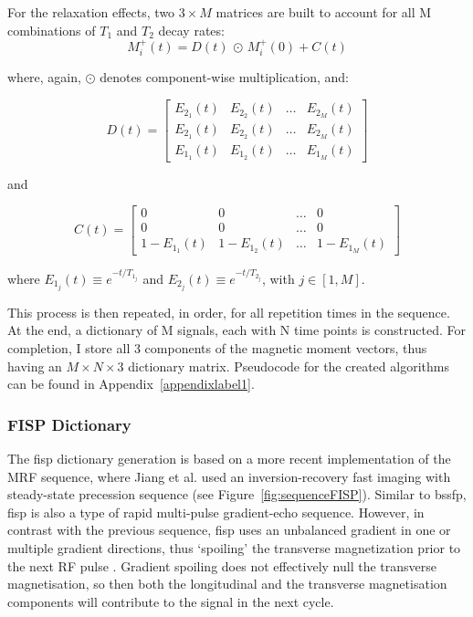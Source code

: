 For the relaxation effects, two $3 \times M$ matrices are built to account for all M combinations of $T_1$ and $T_2$ decay rates:
\begin{equation}
    M^{+}_i(t) = D(t)  \, \odot \, M^{+}_i(0) + C(t) 
\end{equation}

where, again, $\odot$ denotes component-wise multiplication, and:

\begin{equation}
    D(t)  = 
    \begin{bmatrix}
        E_{2_1}(t)  & E_{2_2}(t)  & \dots & E_{2_M}(t)  \\
        E_{2_1}(t)  & E_{2_2}(t)  & \dots & E_{2_M}(t)  \\
        E_{1_1}(t)  & E_{1_2}(t)  & \dots & E_{1_M}(t)  
    \end{bmatrix}
\end{equation}

and

\begin{equation}
    C(t)  = 
    \begin{bmatrix}
        0 & 0 & \dots & 0 \\
        0 & 0 & \dots & 0 \\
        1 - E_{1_1}(t)  & 1- E_{1_2}(t)  & \dots & 1- E_{1_M}(t)  
    \end{bmatrix} 
\end{equation}

where $E_{1_j}(t) \equiv e^{-t/T_{1_j}}$ and $E_{2_j}(t) \equiv e^{-t/T_{2_j}}$, with $j \in [1, M]$.

\hfill 

This process is then repeated, in order, for all repetition times in the sequence.
At the end, a dictionary of M signals, each with N time points is constructed.
For completion, I store all 3 components of the magnetic moment vectors, thus having an $M \times N \times 3$ dictionary matrix.
Pseudocode for the created algorithms can be found in Appendix~\ref{appendixlabel1}.

\hfill

\subsubsection{FISP Dictionary} 
\label{method:fispdictionary}

The \ac{fisp} dictionary generation is based on a more recent implementation of the MRF sequence, where Jiang et al. \cite{Jiang2015} used an inversion-recovery fast imaging with steady-state precession sequence (see Figure~\ref{fig:sequenceFISP}).
Similar to \ac{bssfp}, \ac{fisp} is also a type of rapid multi-pulse gradient-echo sequence.
However, in contrast with the previous sequence, \ac{fisp} uses an unbalanced gradient in one or multiple gradient directions, thus `spoiling' the transverse magnetization prior to the next RF pulse \cite{Hargreaves2012}.
Gradient spoiling does not effectively null the transverse magnetisation, so then both the longitudinal and the transverse magnetisation components will contribute to the signal in the next cycle.

